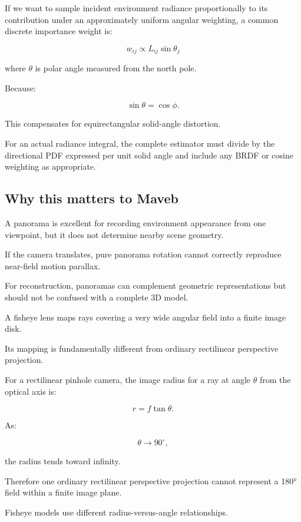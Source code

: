 If we want to sample incident environment radiance proportionally to its contribution under an approximately uniform angular weighting, a common discrete importance weight is:

\[ \boxed{ w_{ij}\propto L_{ij}\sin\theta_j } \]

where \(\theta\) is polar angle measured from the north pole.

Because:

\[ \sin\theta=\cos\phi. \]

This compensates for equirectangular solid-angle distortion.

For an actual radiance integral, the complete estimator must divide by the directional PDF expressed per unit solid angle and include any BRDF or cosine weighting as appropriate.

\subsection{Why this matters to Maveb}\label{02-foundations-ii-ch035-why-this-matters-to-maveb}

\hypertarget{02-foundations-ii-ch035-why-this-matters-to-maveb}{}

A panorama is excellent for recording environment appearance from one viewpoint, but it does not determine nearby scene geometry.

If the camera translates, pure panorama rotation cannot correctly reproduce near-field motion parallax.

For reconstruction, panoramas can complement geometric representations but should not be confused with a complete 3D model.

A fisheye lens maps rays covering a very wide angular field into a finite image disk.

Its mapping is fundamentally different from ordinary rectilinear perspective projection.

For a rectilinear pinhole camera, the image radius for a ray at angle \(\theta\) from the optical axis is:

\[ \boxed{ r=f\tan\theta. } \]

As:

\[ \theta\to90^\circ, \]

the radius tends toward infinity.

Therefore one ordinary rectilinear perspective projection cannot represent a 180° field within a finite image plane.

Fisheye models use different radius-versus-angle relationships.

